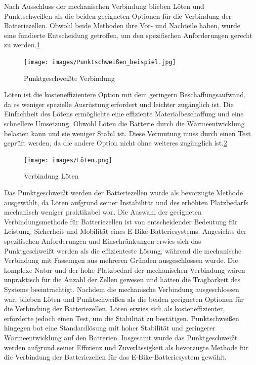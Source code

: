 Nach Ausschluss der mechanischen Verbindung blieben Löten und Punktschweißen als die beiden geeigneten Optionen für die Verbindung der Batteriezellen.
Obwohl beide Methoden ihre Vor- und Nachteile haben, wurde eine fundierte Entscheidung getroffen, um den spezifischen Anforderungen gerecht zu werden.\ref{fig:3}\\
\begin{figure}[ht]
    \centering
    \texttt{[image: images/Punktschweißen\_beispiel.jpg]}
    \caption{ Punktgeschweißte Verbindung\cite{LorenzScherrer.02.03.2024}}%
    \label{fig:3}
\end{figure}

Löten ist die kosteneffizientere Option mit dem geringern Beschaffungsaufwand, da es weniger spezielle Ausrüstung erfordert und leichter zugänglich ist.
Die Einfachheit des Lötens ermöglichte eine effiziente Materialbeschaffung und eine schnellere Umsetzung.
Obwohl Löten die Batterie durch die Wärmeentwicklung belasten kann und sie weniger Stabil ist.
Diese Vermutung muss durch einen Test geprüft werden, da die andere Option nicht ohne weiteres zugänglich ist.\ref{fig:4}\\
\begin{figure}[ht]
    \centering
    \texttt{[image: images/Löten.png]}
    \caption{ Verbindung Löten\cite{LorenzScherrer.02.03.2024}}
    \label{fig:4}
\end{figure}

Das Punktgeschweißt werden der Batteriezellen wurde als bevorzugte Methode ausgewählt, da Löten aufgrund seiner Instabilität und des erhöhten Platzbedarfs mechanisch weniger praktikabel war.
Die Auswahl der geeigneten Verbindungsmethode für Batteriezellen ist von entscheidender Bedeutung für Leistung, Sicherheit und Mobilität eines E-Bike-Batteriesystems.
Angesichts der spezifischen Anforderungen und Einschränkungen erwies sich das Punktgeschweißt werden als die effizienteste Lösung, während die mechanische Verbindung mit Fassungen aus mehreren Gründen ausgeschlossen wurde.
Die komplexe Natur und der hohe Platzbedarf der mechanischen Verbindung wären unpraktisch für die Anzahl der Zellen gewesen und hätten die Tragbarkeit des Systems beeinträchtigt.
Nachdem die mechanische Verbindung ausgeschlossen war, blieben Löten und Punktschweißen als die beiden geeigneten Optionen für die Verbindung der Batteriezellen.
Löten erwies sich als kosteneffizienter, erforderte jedoch einen Test, um die Stabilität zu bestätigen.
Punktschweißen hingegen bot eine Standardlösung mit hoher Stabilität und geringerer Wärmeentwicklung auf den Batterien.
Insgesamt wurde das Punktgeschweißt werden aufgrund seiner Effizienz und Zuverlässigkeit als bevorzugte Methode für die Verbindung der Batteriezellen für das E-Bike-Batteriesystem gewählt.\\




